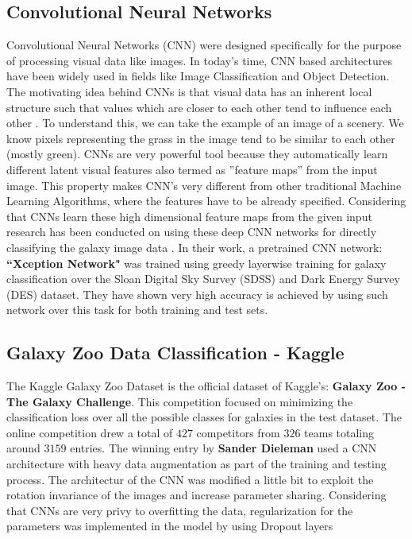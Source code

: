 \documentclass{article}
\begin{document}
\subsection{Convolutional Neural Networks}
Convolutional Neural Networks (CNN) were designed specifically for the purpose of processing visual data like images. In today’s time, CNN based architectures have been widely used in fields like Image Classification \cite{imagenet} and Object Detection. The motivating idea behind CNNs is that visual data has an inherent local structure such that values which are closer to each other tend to influence each other \cite{cnn}. To understand this, we can take the example of an image of a scenery. We know pixels representing the grass in the image tend to be similar to each other (mostly green). CNNs are very powerful tool because they automatically learn different latent visual features also termed as ”feature maps” from the input image. This property makes CNN’s very different from other traditional Machine Learning Algorithms, where the features have to be already specified. Considering that CNNs learn these high dimensional feature maps from the given input research has been conducted on using these deep CNN networks for directly classifying the galaxy image data \cite{khan}. In their work, a pretrained CNN network: \textbf{``Xception Network"} \cite{xception} was trained using greedy layerwise training for galaxy classification over the Sloan Digital Sky Survey (SDSS) and Dark Energy Survey (DES) dataset. They have shown very high accuracy is achieved by using such network over this task for both training and test sets.

\subsection{Galaxy Zoo Data Classification - Kaggle}
The Kaggle Galaxy Zoo Dataset is the official dataset of Kaggle's: \textbf{Galaxy Zoo - The Galaxy Challenge}. This competition focused on minimizing the classification loss over all the possible classes for galaxies in the test dataset. The online competition drew a total of $427$ competitors from $326$ teams totaling around $3159$ entries. The winning entry by \textbf{Sander Dieleman} used a CNN architecture with heavy data augmentation as part of the training and testing process. The architectur of the CNN was modified a little bit to exploit the rotation invariance of the images and increase parameter sharing. Considering that CNNs are very privy to overfitting the data, regularization for the parameters was implemented in the model by using Dropout layers \cite{dropout}
\end{document}
